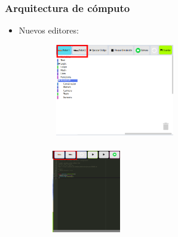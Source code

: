 \documentclass[xcolor={table}]{beamer}
\begin{document}
		\begin{frame}
			\frametitle{Arquitectura de cómputo}
			\begin{itemize}
			     \item Nuevos editores:
			\end{itemize}
				\begin{figure}[H]
                \centering
                \begin{subfigure}{\textwidth}
                 \includegraphics[width=5.5cm, height=4cm]{img/competitivoEditorScratch.png}
                 \label{fig:ir}
                \end{subfigure}
                \begin{subfigure}{\textwidth}
                 \includegraphics[width=3cm, height=4cm]{img/competitiveEditorJavascript.png}
                \label{fig:vision}
                \end{subfigure}
                \end{figure}
		\end{frame}
		
\end{document}
